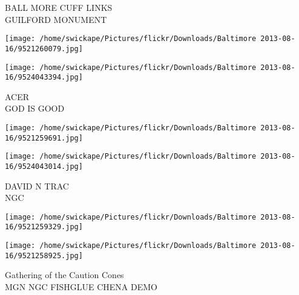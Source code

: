 \documentclass[10pt,letterpaper]{article}
\begin{document}
BALL MORE CUFF LINKS\\
GUILFORD MONUMENT
\pagebreak

\texttt{[image: /home/swickape/Pictures/flickr/Downloads/Baltimore 2013-08-16/9521260079.jpg]}

\vspace{0.25in}
\texttt{[image: /home/swickape/Pictures/flickr/Downloads/Baltimore 2013-08-16/9524043394.jpg]}

ACER\\
GOD IS GOOD
\pagebreak

\texttt{[image: /home/swickape/Pictures/flickr/Downloads/Baltimore 2013-08-16/9521259691.jpg]}

\vspace{0.25in}
\texttt{[image: /home/swickape/Pictures/flickr/Downloads/Baltimore 2013-08-16/9524043014.jpg]}

DAVID N TRAC\\
NGC
\pagebreak

\texttt{[image: /home/swickape/Pictures/flickr/Downloads/Baltimore 2013-08-16/9521259329.jpg]}

\vspace{0.25in}
\texttt{[image: /home/swickape/Pictures/flickr/Downloads/Baltimore 2013-08-16/9521258925.jpg]}

Gathering of the Caution Cones\\
MGN NGC FISHGLUE CHENA DEMO
\pagebreak
\end{document}
